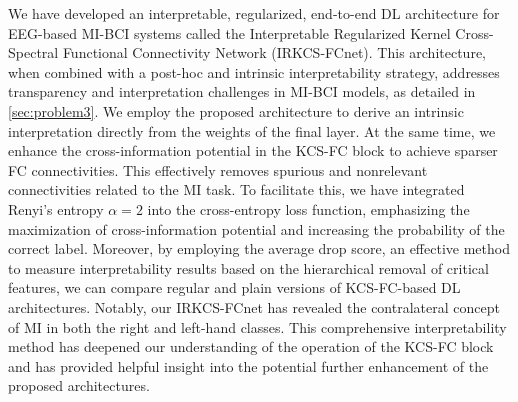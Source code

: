 We have developed an interpretable, regularized, end-to-end DL architecture for EEG-based MI-BCI systems called the Interpretable Regularized Kernel Cross-Spectral Functional Connectivity Network (IRKCS-FCnet). This architecture, when combined with a post-hoc and intrinsic interpretability strategy, addresses transparency and interpretation challenges in MI-BCI models, as detailed in \cref{sec:problem3}. We employ the proposed architecture to derive an intrinsic interpretation directly from the weights of the final layer. At the same time, we enhance the cross-information potential in the KCS-FC block to achieve sparser FC connectivities. This effectively removes spurious and nonrelevant connectivities related to the MI task. To facilitate this, we have integrated Renyi's entropy $\alpha=2$ into the cross-entropy loss function, emphasizing the maximization of cross-information potential and increasing the probability of the correct label. Moreover, by employing the average drop score, an effective method to measure interpretability results based on the hierarchical removal of critical features, we can compare regular and plain versions of KCS-FC-based DL architectures. Notably, our IRKCS-FCnet has revealed the contralateral concept of MI in both the right and left-hand classes. This comprehensive interpretability method has deepened our understanding of the operation of the KCS-FC block and has provided helpful insight into the potential further enhancement of the proposed architectures.